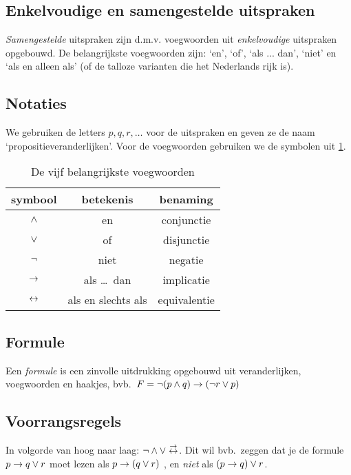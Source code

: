 \subsection{Enkelvoudige en samengestelde uitspraken}
\emph{Samengestelde} uitspraken zijn d.m.v. voegwoorden uit \emph{enkelvoudige} uitspraken opgebouwd. De belangrijkste voegwoorden zijn: `en', `of', `als ... dan', `niet' en `als en alleen als' (of de talloze varianten die het Nederlands rijk is).
\subsection{Notaties}
We gebruiken de letters $p, q, r, \ldots$ voor de uitspraken en geven ze de naam `propositieveranderlijken'. Voor de voegwoorden gebruiken we de symbolen uit \cref{tbl:voegwoorden}.


\begin{table}[htb]
  \centering
  \caption{De vijf belangrijkste voegwoorden}\label{tbl:voegwoorden}
\begin{tabular}{ccc}
\toprule
 symbool  & betekenis & benaming \\ \midrule
  $\wedge$ & en & conjunctie\index{conjunctie} \\
   $\vee$ & of & disjunctie\index{disjunctie} \\
   $\neg$ & niet & negatie\index{negatie} \\
   $\rightarrow$ & als \ldots\ dan & implicatie\index{implicatie} \\
   $\leftrightarrow$ & als en slechts als & equivalentie\index{equivalentie} \\
\bottomrule
\end{tabular}
\end{table}

\subsection{Formule}
Een \emph{formule} is een zinvolle uitdrukking opgebouwd uit veranderlijken, voegwoorden en haakjes,
bvb.\ $F = \neg (p \wedge q) \rightarrow (\neg r \vee p)$

\subsection{Voorrangsregels}
In volgorde van hoog naar laag: $\neg \wedge \vee \stackrel{\rightarrow}{\leftrightarrow}$. Dit wil bvb.\ zeggen dat je de formule  $p \rightarrow q \vee r$ moet lezen als $p \rightarrow (q \vee r)$ , en \emph{niet} als $(p \rightarrow q) \vee r$.

